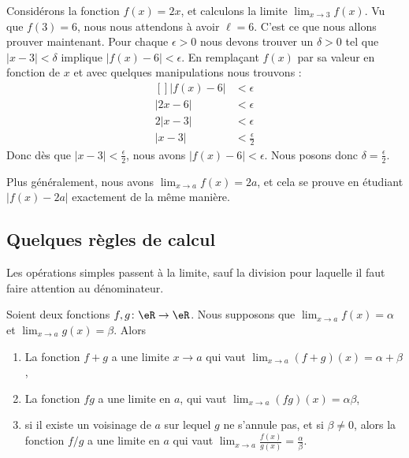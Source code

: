 \begin{example}
	Considérons la fonction \( f(x)=2x\), et calculons la limite \( \lim_{x\to 3} f(x)\). Vu que \( f(3)=6\), nous nous attendons à avoir \( \ell=6\). C'est ce que nous allons prouver maintenant. Pour chaque \( \epsilon>0\) nous devons trouver un \( \delta>0\) tel que \( | x-3 |<\delta\) implique \( | f(x)-6 |<\epsilon\). En remplaçant \( f(x)\) par sa valeur en fonction de \( x\) et avec quelques manipulations nous trouvons :
	\begin{equation}
		\begin{aligned}[]
			| f(x)-6 | & <\epsilon             \\
			| 2x-6 |   & <\epsilon             \\
			2| x-3 |   & <\epsilon             \\
			| x-3 |    & <\frac{ \epsilon }{2}
		\end{aligned}
	\end{equation}
	Donc dès que \( | x-3 |<\frac{ \epsilon }{2}\), nous avons \( | f(x)-6 |<\epsilon\). Nous posons donc \( \delta=\frac{ \epsilon }{2}\).

	Plus généralement, nous avons \( \lim_{x\to a} f(x)=2a\), et cela se prouve en étudiant \( | f(x)-2a |\) exactement de la même manière.
\end{example}

\subsection{Quelques règles de calcul}

Les opérations simples passent à la limite, sauf la division pour laquelle il faut faire attention au dénominateur.
\begin{proposition}     \label{PropOpsSimplesLimites}
	Soient deux fonctions \( f,g\colon \eR\to \eR\). Nous supposons que \( \lim_{x\to a} f(x)=\alpha\) et \( \lim_{x\to a} g(x)=\beta\). Alors
	\begin{enumerate}
		\item   \label{ITEMooOJUWooQpqqnQ}
		      La fonction \( f+g\) a une limite \( x\to a\) qui vaut \( \lim_{x\to a} (f+g)(x)=\alpha+\beta\),
		\item
		      La fonction \( fg\) a une limite en \( a\), qui vaut \( \lim_{x\to a} (fg)(x)=\alpha\beta\),
		\item
		      si il existe un voisinage de \( a\) sur lequel \( g\) ne s'annule pas, et si \( \beta\neq 0\), alors la fonction \( f/g\) a une limite en \( a\) qui vaut \( \lim_{x\to a} \frac{ f(x) }{ g(x) }=\frac{ \alpha }{ \beta }\).
	\end{enumerate}
\end{proposition}

